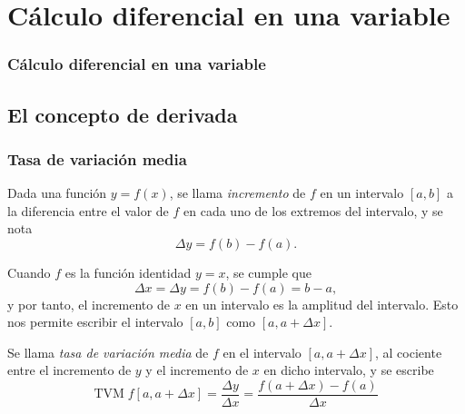

\section{Cálculo diferencial en una variable} 
\begin{frame}
\frametitle{Cálculo diferencial en una variable}
\tableofcontents[sectionstyle=show/hide,hideothersubsections]
\end{frame}


\subsection{El concepto de derivada}
\begin{frame}
\frametitle{Tasa de variación media}
\begin{definicion}[Incremento]
Dada una función $y=f(x)$, se llama \emph{incremento} de $f$ en un intervalo $[a,b]$ a la diferencia entre el valor de $f$ en cada uno de los extremos del intervalo, y se nota
\[\Delta y= f(b)-f(a).\]
\end{definicion}

Cuando $f$ es la función identidad $y=x$, se cumple que
\[\Delta x=\Delta y= f(b)-f(a)=b-a,\]
y por tanto, el incremento de $x$ en un intervalo es la amplitud del intervalo. Esto nos permite escribir el intervalo $[a,b]$ como $[a,a+\Delta x]$.

\begin{definicion}
Se llama \emph{tasa de variación media} de $f$ en el intervalo $[a,a+\Delta x]$, al cociente entre el incremento de $y$ y el incremento de $x$ en dicho intervalo, y se escribe
\[
\textrm{TVM}\;f[a,a+\Delta x]=\frac{\Delta y}{\Delta x}=\frac{f(a+\Delta x)-f(a)}{\Delta x} 
\]
\end{definicion}
\end{frame}



